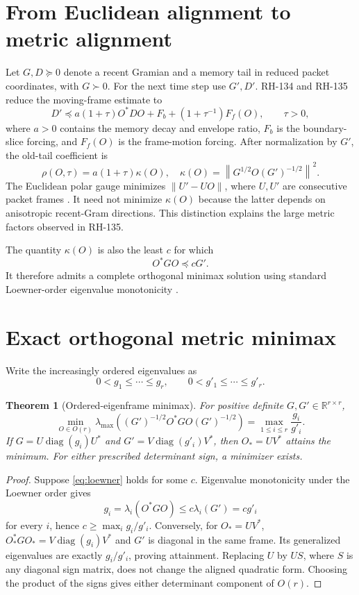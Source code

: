 \documentclass[12pt]{article}
\newtheorem{theorem}{Theorem}
\begin{document}
\section{From Euclidean alignment to metric alignment}
Let $G,D\succcurlyeq0$ denote a recent Gramian and a memory tail in reduced
packet coordinates, with $G\succ0$.  For the next time step use $G',D'$.
RH-134 and RH-135 reduce the moving-frame estimate to
\begin{equation}\label{eq:raw}
 D'\preceq a(1+\tau)O^*DO+F_b+(1+\tau^{-1})F_f(O),
 \qquad \tau>0,
\end{equation}
where $a>0$ contains the memory decay and envelope ratio, $F_b$ is the
boundary-slice forcing, and $F_f(O)$ is the frame-motion forcing.  After
normalization by $G'$, the old-tail coefficient is
\[
 \rho(O,\tau)=a(1+\tau)\kappa(O),
 \quad
 \kappa(O)=\left\|G^{1/2}O(G')^{-1/2}\right\|^2.
\]
The Euclidean polar gauge minimizes
$\|U'-UO\|$, where $U,U'$ are consecutive packet frames
\citep{Schonemann1966}.  It need not
minimize $\kappa(O)$ because the latter depends on anisotropic recent-Gram
directions.  This distinction explains the large metric factors observed in
RH-135.

The quantity $\kappa(O)$ is also the least $c$ for which
\begin{equation}\label{eq:loewner}
 O^*GO\preceq cG'.
\end{equation}
It therefore admits a complete orthogonal minimax solution using standard
Loewner-order eigenvalue monotonicity \citep{Bhatia1997,HornJohnson1991}.

\section{Exact orthogonal metric minimax}
Write the increasingly ordered eigenvalues as
\[
 0<g_1\leq\cdots\leq g_r,
 \qquad
 0<g'_1\leq\cdots\leq g'_r.
\]

\begin{theorem}[Ordered-eigenframe minimax]\label{thm:minimax}
For positive definite $G,G'\in\mathbb{R}^{r\times r}$,
\[
 \min_{O\in O(r)}
 \lambda_{\max}\!\left((G')^{-1/2}O^*GO(G')^{-1/2}\right)
 =\max_{1\leq i\leq r}\frac{g_i}{g'_i}.
\]
If $G=U\operatorname{diag}(g_i)U^*$ and
$G'=V\operatorname{diag}(g'_i)V^*$, then $O_*=UV^*$ attains the minimum.
For either prescribed determinant sign, a minimizer exists.
\end{theorem}

\begin{proof}
Suppose \eqref{eq:loewner} holds for some $c$.  Eigenvalue monotonicity under
the Loewner order gives
\[
 g_i=\lambda_i(O^*GO)\leq c\lambda_i(G')=cg'_i
\]
for every $i$, hence $c\geq\max_i g_i/g'_i$.  Conversely, for $O_*=UV^*$,
$O_*^*GO_*=V\operatorname{diag}(g_i)V^*$ and $G'$ is diagonal in the same
frame.  Its generalized eigenvalues are exactly $g_i/g'_i$, proving
attainment.  Replacing $U$ by $US$, where $S$ is any diagonal sign matrix,
does not change the aligned quadratic form.  Choosing the product of the
signs gives either determinant component of $O(r)$.
\end{proof}
\end{document}
